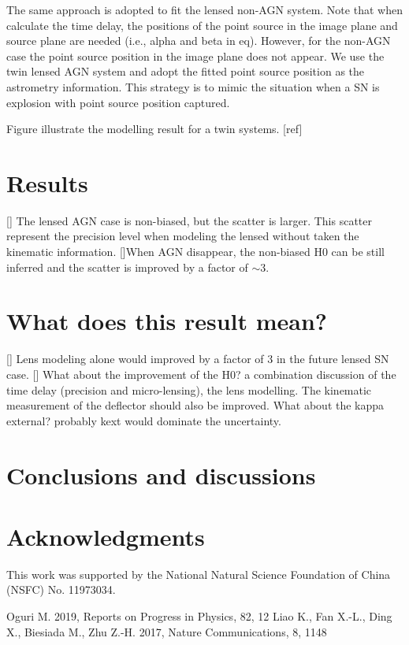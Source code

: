 \documentclass[useAMS,usenatbib,usegraphicx]{mn2e}
\begin{document}
The same approach is adopted to fit the lensed non-AGN system. Note that when calculate the time delay, the positions of the point source in the image plane and source plane are needed (i.e., alpha and beta in eq). However, for the non-AGN case the point source position in the image plane does not appear. We use the twin lensed AGN system and adopt the fitted point source position as the astrometry information. This strategy is to mimic the situation when a SN is explosion  with point source position captured.  

Figure illustrate the modelling result for a twin systems.
[ref]


\section{Results}
[] The lensed AGN case is non-biased, but the scatter is larger. This scatter represent the precision level when modeling the lensed without taken the kinematic information. 
[]When AGN disappear, the non-biased H0 can be still inferred and the scatter is improved by a factor of $\sim$3. 

\section{What does this result mean?}
[] Lens modeling alone would improved by a factor of 3 in the future lensed SN case.
[] What about the improvement of the H0? a combination discussion of the time delay (precision and micro-lensing), the lens modelling. The kinematic measurement of the deflector should also be improved. What about the kappa external? probably kext would dominate the uncertainty. 

\section{Conclusions and discussions}



\section*{Acknowledgments}
This work was supported by the National Natural Science Foundation of China (NSFC) No. 11973034.





\begin{thebibliography}{}
 Oguri M. 2019, Reports on Progress in Physics, 82, 12
 Liao K., Fan X.-L., Ding X., Biesiada M., Zhu Z.-H. 2017, Nature Communications, 8, 1148
\end{thebibliography}

\label{lastpage}
\end{document}
